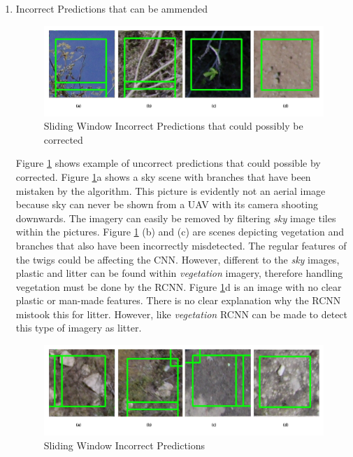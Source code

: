 \documentclass{article}
\begin{document}
\begin{enumerate}
\item Incorrect Predictions that can be ammended
\begin{figure}[H]
\centering
\label{fig:test1correctable}
\includegraphics[scale=0.4]{images/test1-correctable.png}
\caption{Sliding Window Incorrect Predictions that could possibly be corrected}
\end{figure}

Figure \ref{fig:test1correctable} shows example of uncorrect predictions that could possible by corrected. Figure \ref{fig:test1correctable}a shows a sky scene with branches that have been mistaken by the algorithm. This picture is evidently not an aerial image because sky can never be shown from a UAV with its camera shooting downwards. The imagery can easily be removed by filtering \textit{sky} image tiles within the pictures. Figure \ref{fig:test1correctable} (b) and (c) are scenes  depicting vegetation and branches that also have been incorrectly misdetected. The regular features of the twigs could be affecting the CNN. However, different to the \textit{sky} images, plastic and litter can be found within \textit{vegetation} imagery, therefore handling vegetation must be done by the RCNN. Figure \ref{fig:test1correctable}d is an image with no clear plastic or man-made features. There is no clear explanation why the RCNN mistook this for litter. However, like \textit{vegetation} RCNN can be made to detect this type of imagery as litter.

\begin{figure}[H]
\centering
\label{fig:correctable2}
\includegraphics[scale=0.4]{images/test1-unkown.png}
\caption{Sliding Window Incorrect Predictions}
\end{figure}


\end{enumerate}
\end{document}
